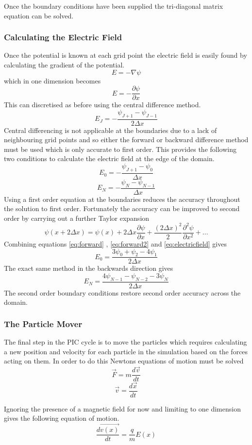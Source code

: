 \documentclass[12pt]{article}
\def\be{\begin{equation}}
\def\ee{\end{equation}}
\begin{document}
Once the boundary conditions have been supplied the tri-diagonal matrix equation can be solved.
 

\subsubsection{Calculating the Electric Field}
Once the potential is known at each grid point the electric field is easily found by calculating the gradient of the potential.
\be 
E = - \nabla \psi
\ee 
which in one dimension becomes
\be 
E = - \frac{\partial \psi}{\partial x}
\label{eq:electricfield}
\ee
This can discretised as before using the central difference method. 
\be 
E_J = - \frac{\psi_{J+1} - \psi_{J-1}}{2 \Delta x}
\ee 
Central differencing is not applicable at the boundaries due to a lack of neighbouring grid points and so either the forward or backward difference method must be used which is only accurate to first order. This provides the following two conditions to calculate the electric field at the edge of the domain.
\be
E_0 = - \frac{\psi_{J+1}-\psi_0}{\Delta x}
\ee 
\be 
E_N = - \frac{\psi_N - \psi_{N-1}}{\Delta x}
\ee
Using a first order equation at the boundaries reduces the accuracy throughout the solution to first order. Fortunately the accuracy can be improved to second order by carrying out a further Taylor expansion 
\be
\psi(x+2\Delta x) = \psi(x) + 2\Delta x \frac{\partial \psi}{\partial x} + \frac{{(2\Delta x)}^2}{2}\frac{{\partial}^2\psi}{\partial x^2} + ...
\label{eq:forward2}
\ee
Combining equations \eqref{eq:forward} , \eqref{eq:forward2} and \eqref{eq:electricfield} gives 
\be 
E_0 = \frac{3\psi_0 + \psi_2 - 4\psi_1}{2\Delta x}
\ee 
The exact same method in the backwards direction gives 
\be 
E_N = \frac{4\psi_{N-1} - \psi_{N-2} - 3\psi_N}{2\Delta x}
\ee
The second order boundary conditions restore second order accuracy across the domain.
\subsubsection{The Particle Mover}
The final step in the PIC cycle is to move the particles which requires calculating a new position and velocity for each particle in the simulation based on the forces acting on them. In order to do this Newtons equations of motion must be solved 
\be 
\vec{F}  = m \frac{d \vec{v}}{d t}
\ee 
\be 
\vec{v} = \frac{d \vec{x}}{d t}
\label{eq:diff2}
\ee 

Ignoring the presence of a magnetic field for now and limiting to one dimension gives the following equation of motion.
\be 
\frac{d \vec{v(x)}}{d t} = \frac{q}{m} E(x)
\label{eq:diff1}
\ee
\end{document}
